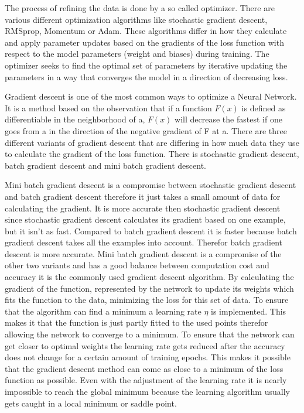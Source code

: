 \documentclass[
a4paper, 
12pt,
grayscalebody, %
abstract=on,
twoside, BCOR10mm, 12pt, DIV13,headinclude, footexclude, final, abstracton, openright
]{ibireprt}
\numberwithin{equation}{chapter}
\numberwithin{table}{chapter}
\numberwithin{figure}{chapter}
\numberwithin{algorithm}{chapter}
\numberwithin{example}{chapter}
\numberwithin{example}{chapter}
\begin{document}

The process of refining the data is done by a so called optimizer. There are various different optimization algorithms like stochastic gradient descent, RMSprop, Momentum or Adam. These algorithms differ in how they calculate and apply parameter updates based on the gradients of the loss function with respect to the model parameters (weight and biases) during training. The optimizer  seeks to find the optimal set of parameters by iterative updating the parameters in a way that converges the model in a direction of decreasing loss.

Gradient descent is one of the most common ways to optimize a Neural Network.\cite{Ruder2016} It is a method based on the observation that if a function $F(x)$ is defined as differentiable in the neighborhood of a, $F(x)$ will decrease the fastest if one goes from a in the direction of the negative gradient of F at a. There are three different variants of gradient descent that are differing in how much data they use to calculate the gradient of the loss function. There is stochastic gradient descent, batch gradient descent and mini batch gradient descent. 

 
Mini batch gradient descent is a compromise between stochastic gradient descent and batch gradient descent therefore it just takes a small amount of data for calculating the gradient. It is more accurate then stochastic gradient descent since stochastic gradient descent calculates its gradient based on one example, but it isn't as fast. Compared to batch gradient descent it is faster because batch gradient descent takes all the examples into account. Therefor batch gradient descent is more accurate. Mini batch gradient descent is a compromise of the other two variants and has a good balance between computation cost and accuracy it is the commonly used gradient descent algorithm. By calculating the gradient of the function, represented by the network to update its weights which fits the function to the data, minimizing the loss for this set of data. To ensure that the algorithm can find a minimum a learning rate $\eta$ is implemented. This makes it that the function is just partly fitted to the used points therefor allowing the network to converge to a minimum. To ensure that the network can get closer to optimal weights the learning rate gets reduced after the accuracy does not change for a certain amount of training epochs.
This makes it possible that the gradient descent method can come as close to a minimum of the loss function as possible. Even with the adjustment of the learning rate it is nearly impossible to reach the global minimum because the learning algorithm usually gets caught in a local minimum or saddle point.
\end{document}
